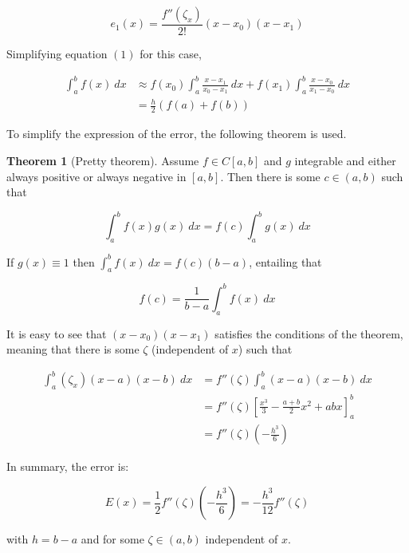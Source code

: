 \documentclass[12pt]{article}
\theoremstyle{definition}
\newtheorem{theorem}{Theorem}
\begin{document}
\begin{equation*}
    e_1(x) = \frac{f''(\zeta_x)}{2!}(x-x_0)(x-x_1)
\end{equation*}

Simplifying equation $(1)$ for this case, 

\begin{align*}
    \int_a^b f(x) ~ dx &\approx f(x_0)\int_a^b \frac{x-x_1}{x_0 - x_1} ~ dx +
    f(x_1) \int_a^b \frac{x-x_0}{x_1 - x_0} ~ dx \\ 
    &= \frac{h}{2}\left( f(a) + f(b) \right) 
\end{align*}

To simplify the expression of the error, the following theorem is used. 

\begin{theorem}[Pretty theorem]
    Assume $f \in C[a,b]$ and $g$ integrable and either always positive or
    always negative in $[a, b]$. Then there is some $c \in (a, b)$ such that 

    \begin{equation*}
        \int_a^b f(x) g(x)~ dx = f(c) \int_a^b g(x) ~ dx
    \end{equation*}

    If $g(x) \equiv 1$ then $\int_a^b f(x) ~ dx = f(c)(b-a)$, entailing that 

    \begin{equation*}
        f(c) = \frac{1}{b-a}\int_a^b f(x) ~ dx
    \end{equation*}
\end{theorem}

It is easy to see that $(x - x_0)(x-x_1)$ satisfies the conditions of the
theorem, meaning that there is some $\zeta$ (independent of $x$) such that 

\begin{align*}
    \int_a^b (\zeta_x)(x-a)(x-b) ~ dx 
    &= f''(\zeta)\int_a^b(x-a)(x-b) ~ dx\\ 
    &= f''(\zeta)\left[ \frac{x^3}{3} - \frac{a+b}{2} x^2 + abx \right]_a^b\\
    &= f''(\zeta) \left( -\frac{h^3}{6} \right) 
\end{align*}

In summary, the error is:


\begin{equation*}
    E(x) = \frac{1}{2}f''(\zeta)\left( -\frac{h^3}{6} \right)  = -\frac{h^3}{12}
    f''(\zeta)
\end{equation*}

with $h = b-a$ and for some $\zeta \in (a, b)$ independent of $x$.
\end{document}
